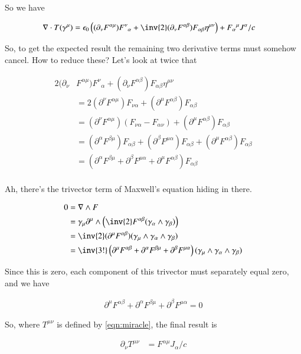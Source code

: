 \documentclass{article}
\begin{document}
So we have

\begin{align*}
\grad \cdot T(\gamma^\mu) 
&= \epsilon_0\left(
(\partial_\nu F^{\alpha\mu}) {F^{\nu}}_{\alpha} + 
\inv{2} (\partial_\nu F^{\alpha\beta}) F_{\alpha\beta} \eta^{\mu\nu} 
\right)
+
{F_{\alpha}}^{\mu} J^\alpha/c
\end{align*}

So, to get the expected result the remaining two derivative terms must somehow cancel.  How to reduce these?  Let's look at twice that

\begin{align*}
2 (\partial_\nu &F^{\alpha\mu}) {F^{\nu}}_{\alpha} + (\partial_\nu F^{\alpha\beta}) F_{\alpha\beta} \eta^{\mu\nu} \\
&= 2 (\partial^\nu F^{\alpha\mu}) F_{\nu\alpha} + (\partial^\mu F^{\alpha\beta}) F_{\alpha\beta} \\
&= (\partial^\nu F^{\alpha\mu}) (F_{\nu\alpha} -F_{\alpha\nu}) + (\partial^\mu F^{\alpha\beta}) F_{\alpha\beta} \\
&= 
(\partial^\alpha F^{\beta\mu}) F_{\alpha\beta} 
+(\partial^\beta F^{\mu\alpha}) F_{\alpha\beta}
+ (\partial^\mu F^{\alpha\beta}) F_{\alpha\beta} \\
&= 
(\partial^\alpha F^{\beta\mu} +\partial^\beta F^{\mu\alpha} + \partial^\mu F^{\alpha\beta}) F_{\alpha\beta} \\
\end{align*}

Ah, there's the trivector term of Maxwell's equation hiding in there.

\begin{align*}
0
&= \grad \wedge F \\
&= \gamma_\mu \partial^\mu \wedge \left(\inv{2} F^{\alpha\beta} (\gamma_\alpha \wedge \gamma_\beta) \right) \\
&= \inv{2} (\partial^\mu F^{\alpha\beta}) (\gamma_\mu \wedge \gamma_\alpha \wedge \gamma_\beta) \\
&= \inv{3!} 
\left(
\partial^\mu F^{\alpha\beta}
+\partial^\alpha F^{\beta\mu} 
+\partial^\beta F^{\mu\alpha}
\right)
(\gamma_\mu \wedge \gamma_\alpha \wedge \gamma_\beta)
\end{align*}

Since this is zero, each component of this trivector must separately equal zero, and we have

\begin{align}
\partial^\mu F^{\alpha\beta} +\partial^\alpha F^{\beta\mu} +\partial^\beta F^{\mu\alpha} = 0
\end{align}

So, where $T^{\mu\nu}$ is defined by \ref{eqn:miracle}, the final result is

\begin{align}
\partial_\nu T^{\mu\nu} &= F^{\alpha\mu} J_\alpha/c
\end{align}



\end{document}
